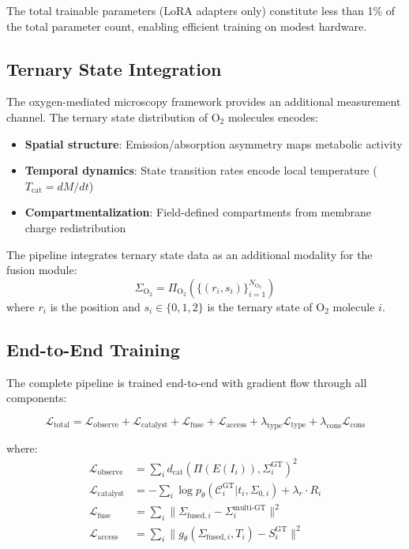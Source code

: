\documentclass[11pt,a4paper]{article}
\theoremstyle{definition}
\theoremstyle{remark}
\newcommand{\dcat}{d_{\mathrm{cat}}}
\newcommand{\Sig}{\Sigma}
\newcommand{\loss}{\mathcal{L}}
\newcommand{\params}{\theta}
\begin{document}
The total trainable parameters (LoRA adapters only) constitute less than 1\% of the total parameter count, enabling efficient training on modest hardware.

\subsection{Ternary State Integration}

The oxygen-mediated microscopy framework provides an additional measurement channel. The ternary state distribution of O$_2$ molecules encodes:
\begin{itemize}
    \item \textbf{Spatial structure}: Emission/absorption asymmetry maps metabolic activity
    \item \textbf{Temporal dynamics}: State transition rates encode local temperature ($T_{\text{cat}} = dM/dt$)
    \item \textbf{Compartmentalization}: Field-defined compartments from membrane charge redistribution
\end{itemize}

The pipeline integrates ternary state data as an additional modality for the fusion module:
\begin{equation}
\Sig_{\text{O}_2} = \Pi_{\text{O}_2}(\{(r_i, s_i)\}_{i=1}^{N_{\text{O}_2}})
\end{equation}
where $r_i$ is the position and $s_i \in \{0, 1, 2\}$ is the ternary state of O$_2$ molecule $i$.

\subsection{End-to-End Training}

The complete pipeline is trained end-to-end with gradient flow through all components:

\begin{equation}
\loss_{\text{total}} = \loss_{\text{observe}} + \loss_{\text{catalyst}} + \loss_{\text{fuse}} + \loss_{\text{access}} + \lambda_{\text{type}} \loss_{\text{type}} + \lambda_{\text{cons}} \loss_{\text{cons}}
\end{equation}

where:
\begin{align}
\loss_{\text{observe}} &= \sum_i \dcat(\Pi(E(I_i)), \Sig_i^{\text{GT}})^2 \\
\loss_{\text{catalyst}} &= -\sum_i \log p_\params(\mathcal{C}_i^{\text{GT}} | t_i, \Sig_{0,i}) + \lambda_r \cdot R_i \\
\loss_{\text{fuse}} &= \sum_i \|\Sig_{\text{fused},i} - \Sig_i^{\text{multi-GT}}\|^2 \\
\loss_{\text{access}} &= \sum_i \|g_\params(\Sig_{\text{fused},i}, T_i) - S_i^{\text{GT}}\|^2
\end{align}
\end{document}

